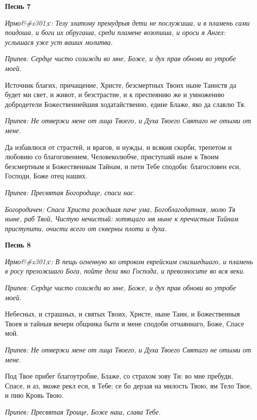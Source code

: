 \bfseries Песнь 7\normalfont{}


\itshape Ирмо&#x301;с:\normalfont{} Телу златому премудрыя дети не послужиша, и в пламень сами поидоша, и боги их обругаша, среди пламене возопиша, и ороси я Ангел: услышася уже уст ваших молитва.


\itshape Припев: \normalfont{}Сердце чисто созижди во мне, Боже, и дух прав обнови во утробе моей.


Источник благих, причащение, Христе, безсмертных Твоих ныне Таинств да будет ми свет, и живот, и безстрастие, и к преспеянию же и умножению добродетели Божественнейшия ходатайственно, едине Блаже, яко да славлю Тя.


\itshape Припев: \normalfont{}Не отвержи мене от лица Твоего, и Духа Твоего Святаго не отыми от мене.


Да избавлюся от страстей, и врагов, и нужды, и всякия скорби, трепетом и любовию со благоговением, Человеколюбче, приступаяй ныне к Твоим безсмертным и Божественным Тайнам, и пети Тебе сподоби: благословен еси, Господи, Боже отец наших.


\itshape Припев: \normalfont{}Пресвятая Богородице, спаси нас.


\itshape Богородичен: \normalfont{}Спаса Христа рождшая паче ума, Богоблагодатная, молю Тя ныне, раб Твой, Чистую нечистый: хотящаго мя ныне к пречистым Тайнам приступити, очисти всего от скверны плоти и духа.




\bfseries Песнь 8\normalfont{}


\itshape Ирмо&#x301;с:\normalfont{} В пещь огненную ко отроком еврейским снизшедшаго, и пламень в росу преложшаго Бога, пойте дела яко Господа, и превозносите во вся веки.


\itshape Припев: \normalfont{}Сердце чисто созижди во мне, Боже, и дух прав обнови во утробе моей.


Небесных, и страшных, и святых Твоих, Христе, ныне Таин, и Божественныя Твоея и тайныя вечери общника быти и мене сподоби отчаяннаго, Боже, Спасе мой.


\itshape Припев: \normalfont{}Не отвержи мене от лица Твоего, и Духа Твоего Святаго не отыми от мене.


Под Твое прибег благоутробие, Блаже, со страхом зову Ти: во мне пребуди, Спасе, и аз, якоже рекл еси, в Тебе; се бо дерзая на милость Твою, ям Тело Твое, и пию Кровь Твою.


\itshape Припев: \normalfont{}Пресвятая Троице, Боже наш, слава Тебе.


